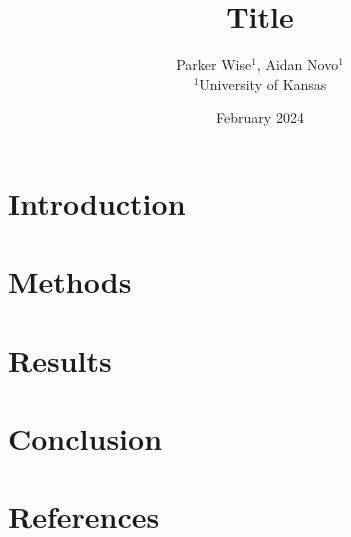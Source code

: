\documentclass[a4paper, 11pt, twocolumn]{article}
\begin{document}
\title{Title}
\author{Parker Wise$^{1}$, Aidan Novo$^{1}$\\$^{1}$University of Kansas}
\date{February 2024}

\section{Introduction}
\section{Methods}
\section{Results}
\section{Conclusion}
\section*{References}
\end{document}
